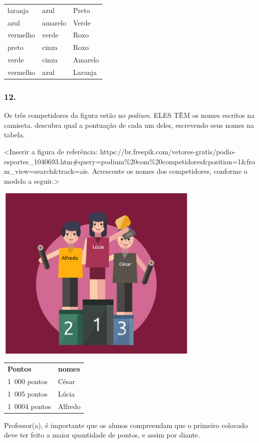 \begin{longtable}[]{@{}lll@{}}
\toprule
laranja & azul & Preto\tabularnewline
azul & amarelo & Verde\tabularnewline
vermelho & verde & Roxo\tabularnewline
preto & cinza & Roxo\tabularnewline
verde & cinza & Amarelo\tabularnewline
vermelho & azul & Laranja\tabularnewline
\bottomrule
\end{longtable}

\subsubsection{12. }\label{section}

Os três competidores da figura estão no \emph{podium}. ELES TÊM os nomes
escritos na camiseta. descubra qual a pontuação de cada um deles,
escrevendo seus nomes na tabela.

\textless{}Inserir a figura de referência:
https://br.freepik.com/vetores-gratis/podio-esportes\_1040693.htm\#query=podium\%20com\%20competidores\&position=1\&from\_view=search\&track=ais.
Acrescente os nomes dos competidores, conforme o modelo a
seguir.\textgreater{}

\includegraphics[width=3.84950in,height=3.34590in]{media/image9.png}

\begin{longtable}[]{@{}ll@{}}
\toprule
\textbf{Pontos} & \textbf{nomes}\tabularnewline
1~000 pontos & César\tabularnewline
1~005 pontos & Lúcia\tabularnewline
1~0004 pontos & Alfredo\tabularnewline
\bottomrule
\end{longtable}

Professor(a), é importante que os alunos compreendam que o primeiro
colocado deve ter feito a maior quantidade de pontos, e assim por
diante.

